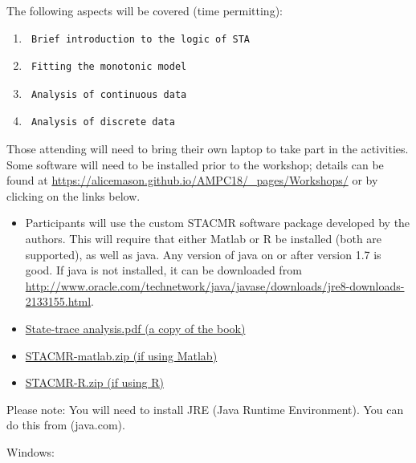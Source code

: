 \documentclass[]{article}
\providecommand{\tightlist}{%
  \setlength{\itemsep}{0pt}\setlength{\parskip}{0pt}}
\begin{document}
The following aspects will be covered (time permitting):

\begin{enumerate}
\def\labelenumi{\arabic{enumi}.}
\item
\begin{verbatim}
 Brief introduction to the logic of STA
\end{verbatim}
\item
\begin{verbatim}
 Fitting the monotonic model
\end{verbatim}
\item
\begin{verbatim}
 Analysis of continuous data
\end{verbatim}
\item
\begin{verbatim}
 Analysis of discrete data
\end{verbatim}
\end{enumerate}

Those attending will need to bring their own laptop to take part in the
activities. Some software will need to be installed prior to the
workshop; details can be found at
\url{https://alicemason.github.io/AMPC18/_pages/Workshops/} or by
clicking on the links below.

\begin{itemize}
\tightlist
\item
  Participants will use the custom STACMR software package developed by
  the authors. This will require that either Matlab or R be installed
  (both are supported), as well as java. Any version of java on or after
  version 1.7 is good. If java is not installed, it can be downloaded
  from
  \url{http://www.oracle.com/technetwork/java/javase/downloads/jre8-downloads-2133155.html}.
\item
  \href{https://alicemason.github.io/AMPC18/assets/statetrace/sta.pdf}{State-trace
  analysis.pdf (a copy of the book)}
\item
  \href{https://alicemason.github.io/AMPC18/assets/statetrace/STACMR-matlab.zip}{STACMR-matlab.zip
  (if using Matlab)}
\item
  \href{https://alicemason.github.io/AMPC18/assets/statetrace/STACMR-R.zip}{STACMR-R.zip
  (if using R)}
\end{itemize}

Please note: You will need to install JRE (Java Runtime Environment).
You can do this from (java.com).

Windows:
\end{document}
